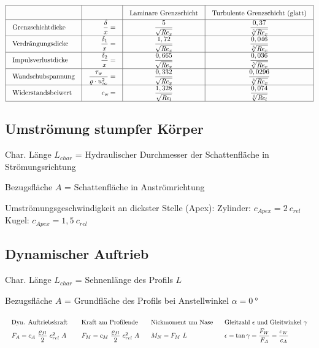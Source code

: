 	\[ \arraycolsep=1em\def\arraystretch{1.7}
	\begin{array}{|l|r|c|c|}
		\hline
		\quad                     & \quad                                                    & \text{Laminare Grenzschicht}  & \text{Turbulente Grenzschicht (glatt)} \\ \hline
		\text{Grenzschichtdicke}  & \dfrac{\delta}{x}                                      = & \dfrac{5}{\sqrt{\Reyn_x}}     & \dfrac{0,37}{\sqrt[5]{\Reyn_x}}        \\ \hline
		\text{Verdrängungsdicke}  & \dfrac{\delta_1}{x}                                    = & \dfrac{1,72}{\sqrt{\Reyn_x}}  & \dfrac{0,046}{\sqrt[5]{\Reyn_x}}       \\ \hline
		\text{Impulsverlustdicke} & \dfrac{\delta_2}{x}                                    = & \dfrac{0,665}{\sqrt{\Reyn_x}} & \dfrac{0,036}{\sqrt[5]{\Reyn_x}}       \\ \hline
		\text{Wandschubspannung}  & \dfrac{\tau_{\textsl{w}}}{\varrho \cdot u^2_{\infty}}  = & \dfrac{0,332}{\sqrt{\Reyn_x}} & \dfrac{0,0296}{\sqrt[5]{\Reyn_x}}      \\ \hline
		\text{Widerstandsbeiwert} & c_{\textsl{w}}                                         = & \dfrac{1,328}{\sqrt{\Reyn_l}} & \dfrac{0,074}{\sqrt[5]{\Reyn_l}}       \\ \hline
	\end{array} \]

	\clearpage
\subsection{Umströmung stumpfer Körper}
	Char. Länge $ L_{char} $ = Hydraulischer Durchmesser der Schattenfläche in Strömungsrichtung

	Bezugsfläche $ A $ = Schattenfläche in Anströmrichtung

	Umströmungsgeschwindigkeit an dickster Stelle (Apex): Zylinder: $ c_{Apex}= 2\ c_{rel} $\quad Kugel: $ c_{Apex}= 1,5\ c_{rel}  $

\subsection{Dynamischer Auftrieb}
	Char. Länge $ L_{char} $ = Sehnenlänge des Profils $ L $

	Bezugsfläche $ A $ = Grundfläche des Profils bei Anstellwinkel $ \alpha = \qty{0}{\degree} $

	\[\arraycolsep=0.9em %
		\begin{array}{llll}
			\text{Dyn. Auftriebskraft }                          & \text{Kraft am Profilende}                           & \text{Nickmoment um Nase} & \text{Gleitzahl } \epsilon \text{ und Gleitwinkel } \gamma  \\
			F_A = c_A\ \dfrac{{\varrho}_{fl}} {2}\ c_{rel}^2 \ A & F_M = c_M\ \dfrac{{\varrho}_{fl}} {2}\ c_{rel}^2 \ A & M_N = F_M\ L              & \epsilon = \tan\gamma = \dfrac{F_W}{F_A} = \dfrac{c_W}{c_A}
		\end{array} \]

